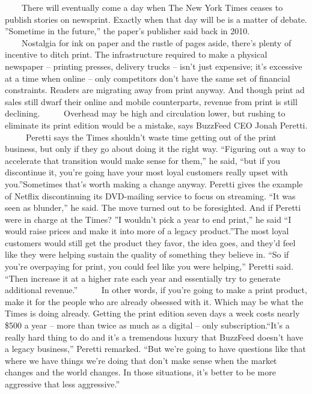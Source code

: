 　　There will eventually come a day when The New York Times ceases to publish stories on newsprint. Exactly when that day will be is a matter of debate. ”Sometime in the future,” the paper’s publisher said back in 2010.
 
　　Nostalgia for ink on paper and the rustle of pages aside, there’s plenty of incentive to ditch print. The infrastructure required to make a physical newspaper – printing presses, delivery trucks – isn’t just expensive; it’s excessive at a time when online – only competitors don’t have the same set of financial constraints. Readers are migrating away from print anyway. And though print ad sales still dwarf their online and mobile counterparts, revenue from print is still declining.
 　　Overhead may be high and circulation lower, but rushing to eliminate its print edition would be a mistake, says BuzzFeed CEO Jonah Peretti.
 　　Peretti says the Times shouldn’t waste time getting out of the print business, but only if they go about doing it the right way. “Figuring out a way to accelerate that transition would make sense for them,” he said, “but if you discontinue it, you’re going have your most loyal customers really upset with you.”Sometimes that’s worth making a change anyway. Peretti gives the example of Netflix discontinuing its DVD-mailing service to focus on streaming. “It was seen as blunder,” he said. The move turned out to be foresighted. And if Peretti were in charge at the Times? ”I wouldn’t pick a year to end print,” he said “I would raise prices and make it into more of a legacy product.”The most loyal customers would still get the product they favor, the idea goes, and they’d feel like they were helping sustain the quality of something they believe in. “So if you’re overpaying for print, you could feel like you were helping,” Peretti said. “Then increase it at a higher rate each year and essentially try to generate additional revenue.”
 　　In other words, if you’re going to make a print product, make it for the people who are already obsessed with it. Which may be what the Times is doing already. Getting the print edition seven days a week costs nearly \$500 a year – more than twice as much as a digital – only subscription.“It’s a really hard thing to do and it’s a tremendous luxury that BuzzFeed doesn’t have a legacy business,” Peretti remarked. “But we’re going to have questions like that where we have things we’re doing that don’t make sense when the market changes and the world changes. In those situations, it’s better to be more aggressive that less aggressive.”
